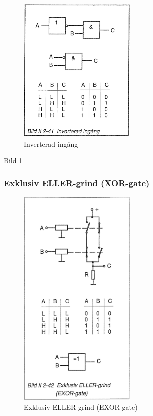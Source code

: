 \begin{figure}
\includegraphics[width=0.5\textwidth]{images/bild_2_2-41}
\caption{Inverterad ingång}
\label{fig:BildII2-41}
\end{figure}

Bild \ref{fig:BildII2-41}

\subsubsection{Exklusiv ELLER-grind (XOR-gate)}

\begin{figure}
\includegraphics[width=0.5\textwidth]{images/bild_2_2-42}
\caption{Exklusiv ELLER-grind (EXOR-gate)}
\label{fig:BildII2-42}
\end{figure}

